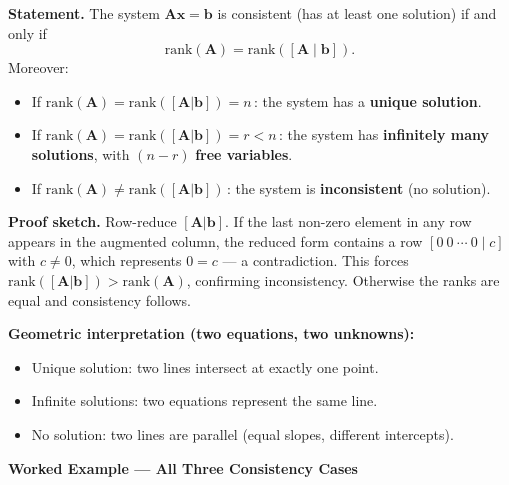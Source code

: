 \documentclass[12pt,a4paper]{article}
\begin{document}
\begin{infobox}
\textbf{Statement.} The system $\mathbf{A}\mathbf{x} = \mathbf{b}$ is consistent (has at least one solution)
if and only if
\[
\text{rank}(\mathbf{A}) = \text{rank}([\mathbf{A} \mid \mathbf{b}]).
\]
Moreover:
\begin{itemize}[leftmargin=1.5em]
  \item If $\text{rank}(\mathbf{A}) = \text{rank}([\mathbf{A}|\mathbf{b}]) = n$\,:
        the system has a \textbf{unique solution}.
  \item If $\text{rank}(\mathbf{A}) = \text{rank}([\mathbf{A}|\mathbf{b}]) = r < n$\,:
        the system has \textbf{infinitely many solutions}, with $(n - r)$ \textbf{free variables}.
  \item If $\text{rank}(\mathbf{A}) \neq \text{rank}([\mathbf{A}|\mathbf{b}])$\,:
        the system is \textbf{inconsistent} (no solution).
\end{itemize}

\textbf{Proof sketch.} Row-reduce $[\mathbf{A}|\mathbf{b}]$.
If the last non-zero element in any row appears in the augmented column, the reduced form contains
a row $[0 \ 0 \ \cdots \ 0 \mid c]$ with $c \neq 0$, which represents $0 = c$ --- a contradiction.
This forces $\text{rank}([\mathbf{A}|\mathbf{b}]) > \text{rank}(\mathbf{A})$, confirming inconsistency.
Otherwise the ranks are equal and consistency follows.

\textbf{Geometric interpretation (two equations, two unknowns):}
\begin{itemize}[leftmargin=1.5em]
  \item Unique solution: two lines intersect at exactly one point.
  \item Infinite solutions: two equations represent the same line.
  \item No solution: two lines are parallel (equal slopes, different intercepts).
\end{itemize}
\end{infobox}

\textbf{Worked Example --- All Three Consistency Cases}
\end{document}
